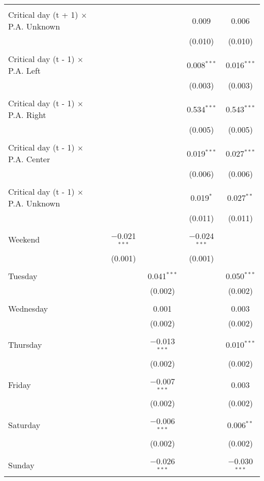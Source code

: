 \documentclass[
]{article}
\begin{document}
\begin{table}[!htbp]
{\begin{tabular}{@{\extracolsep{5pt}}lcccc}
  & & & & \\ 
 Critical day (t + 1) $\times$ P.A. Unknown &  &  & 0.009 & 0.006 \\ 
  &  &  & (0.010) & (0.010) \\ 
  & & & & \\ 
 Critical day (t - 1) $\times$ P.A. Left &  &  & 0.008$^{***}$ & 0.016$^{***}$ \\ 
  &  &  & (0.003) & (0.003) \\ 
  & & & & \\ 
 Critical day (t - 1) $\times$ P.A. Right &  &  & 0.534$^{***}$ & 0.543$^{***}$ \\ 
  &  &  & (0.005) & (0.005) \\ 
  & & & & \\ 
 Critical day (t - 1) $\times$ P.A. Center &  &  & 0.019$^{***}$ & 0.027$^{***}$ \\ 
  &  &  & (0.006) & (0.006) \\ 
  & & & & \\ 
 Critical day (t - 1) $\times$ P.A. Unknown &  &  & 0.019$^{*}$ & 0.027$^{**}$ \\ 
  &  &  & (0.011) & (0.011) \\ 
  & & & & \\ 
 Weekend & $-$0.021$^{***}$ &  & $-$0.024$^{***}$ &  \\ 
  & (0.001) &  & (0.001) &  \\ 
  & & & & \\ 
 Tuesday &  & 0.041$^{***}$ &  & 0.050$^{***}$ \\ 
  &  & (0.002) &  & (0.002) \\ 
  & & & & \\ 
 Wednesday &  & 0.001 &  & 0.003 \\ 
  &  & (0.002) &  & (0.002) \\ 
  & & & & \\ 
 Thursday &  & $-$0.013$^{***}$ &  & 0.010$^{***}$ \\ 
  &  & (0.002) &  & (0.002) \\ 
  & & & & \\ 
 Friday &  & $-$0.007$^{***}$ &  & 0.003 \\ 
  &  & (0.002) &  & (0.002) \\ 
  & & & & \\ 
 Saturday &  & $-$0.006$^{***}$ &  & 0.006$^{**}$ \\ 
  &  & (0.002) &  & (0.002) \\ 
  & & & & \\ 
 Sunday &  & $-$0.026$^{***}$ &  & $-$0.030$^{***}$ \\ 

\end{tabular}}
\end{table}
\end{document}
